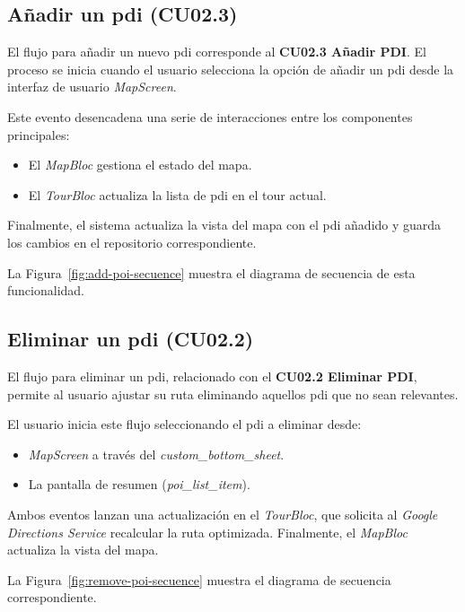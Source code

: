 \subsection{Añadir un \acrfull{pdi} (CU02.3)}
El flujo para añadir un nuevo \acrshort{pdi} corresponde al \textbf{CU02.3 Añadir PDI}. El proceso se inicia cuando el usuario selecciona la opción de añadir un \acrshort{pdi} desde la interfaz de usuario \textit{MapScreen}. 

Este evento desencadena una serie de interacciones entre los componentes principales:
\begin{itemize}
	\item El \textit{MapBloc} gestiona el estado del mapa.
	\item El \textit{TourBloc} actualiza la lista de \acrshort{pdi} en el tour actual.
\end{itemize}
Finalmente, el sistema actualiza la vista del mapa con el \acrshort{pdi} añadido y guarda los cambios en el repositorio correspondiente.

La Figura~\ref{fig:add-poi-secuence} muestra el diagrama de secuencia de esta funcionalidad.


\subsection{Eliminar un \acrshort{pdi} (CU02.2)}
El flujo para eliminar un \acrshort{pdi}, relacionado con el \textbf{CU02.2 Eliminar PDI}, permite al usuario ajustar su ruta eliminando aquellos \acrshort{pdi} que no sean relevantes.

El usuario inicia este flujo seleccionando el \acrshort{pdi} a eliminar desde:
\begin{itemize}
	\item \textit{MapScreen} a través del \textit{custom\_bottom\_sheet}.
	\item La pantalla de resumen (\textit{poi\_list\_item}).
\end{itemize}
Ambos eventos lanzan una actualización en el \textit{TourBloc}, que solicita al \textit{Google Directions Service} recalcular la ruta optimizada. Finalmente, el \textit{MapBloc} actualiza la vista del mapa.

La Figura~\ref{fig:remove-poi-secuence} muestra el diagrama de secuencia correspondiente.


